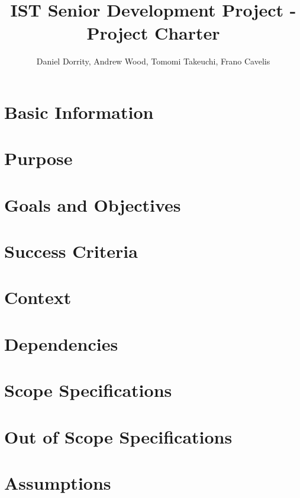 \documentclass{article}
\title{IST Senior Development Project - Project Charter}
\author{Daniel Dorrity, Andrew Wood, Tomomi Takeuchi, Frano Cavelis}
\begin{document}
	\maketitle
	\newpage
	
	\tableofcontents
	\newpage
	
	\section{Basic Information}
		
		
	\section{Purpose}
		
		
	\section{Goals and Objectives}
		
		
	\section{Success Criteria}
		
		
	\section{Context}
		
		
	\section{Dependencies}
		
		
	\section{Scope Specifications}
		
		
	\section{Out of Scope Specifications}
		
		
	\section{Assumptions}
		
		
\end{document}

